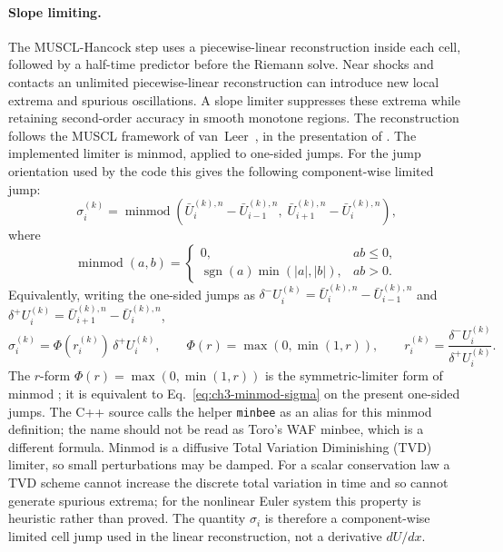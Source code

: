 \paragraph{Slope limiting.}
The MUSCL-Hancock step uses a piecewise-linear reconstruction inside each cell,
followed by a half-time predictor before the Riemann solve. Near shocks and
contacts an unlimited piecewise-linear reconstruction can introduce new local
extrema and spurious oscillations. A slope limiter suppresses these extrema
while retaining second-order accuracy in smooth monotone regions. The
reconstruction follows the MUSCL framework of van~Leer~\citep{vanleer_1979}, in
the presentation of \citet{toro2009}. The implemented limiter is minmod, applied
to one-sided jumps. For the jump orientation used by the code this gives the
following component-wise limited jump:
\begin{equation}\label{eq:ch3-minmod-sigma}
  \sigma_i^{(k)}
  =
  \operatorname{minmod}\!\left(\bar U_i^{(k),n}-\bar U_{i-1}^{(k),n},\;
                               \bar U_{i+1}^{(k),n}-\bar U_i^{(k),n}\right),
\end{equation}
where
\begin{equation}\label{eq:ch3-minmod-def}
  \operatorname{minmod}(a,b)
  =
  \begin{cases}
    0, & ab\le 0,\\
    \operatorname{sgn}(a)\min\!\left(|a|,|b|\right), & ab>0 .
  \end{cases}
\end{equation}
Equivalently, writing the one-sided jumps as
\(\delta^- U_i^{(k)} = \bar U_i^{(k),n}-\bar U_{i-1}^{(k),n}\) and
\(\delta^+ U_i^{(k)} = \bar U_{i+1}^{(k),n}-\bar U_i^{(k),n}\),
\begin{equation}\label{eq:ch3-minmod-function}
  \sigma_i^{(k)} = \Phi(r_i^{(k)})\,\delta^+ U_i^{(k)},\qquad
  \Phi(r) = \max(0, \min(1, r)),\qquad
  r_i^{(k)} = \frac{\delta^- U_i^{(k)}}{\delta^+ U_i^{(k)}} .
\end{equation}
The \(r\)-form \(\Phi(r) = \max(0,\min(1,r))\) is the symmetric-limiter form of minmod \citep{toro2009}; it is equivalent to Eq.~\ref{eq:ch3-minmod-sigma} on the present one-sided jumps. The C++ source calls the helper \texttt{minbee} as an alias for this minmod definition; the name should not be read as Toro's WAF minbee, which is a different formula.
Minmod is a diffusive Total Variation Diminishing (TVD) limiter, so small
perturbations may be damped. For a scalar conservation law a TVD scheme cannot
increase the discrete total variation in time and so cannot generate spurious
extrema; for the nonlinear Euler system this property is heuristic rather than
proved. The quantity \(\sigma_i\) is therefore a component-wise limited cell
jump used in the linear reconstruction, not a derivative \(dU/dx\).

